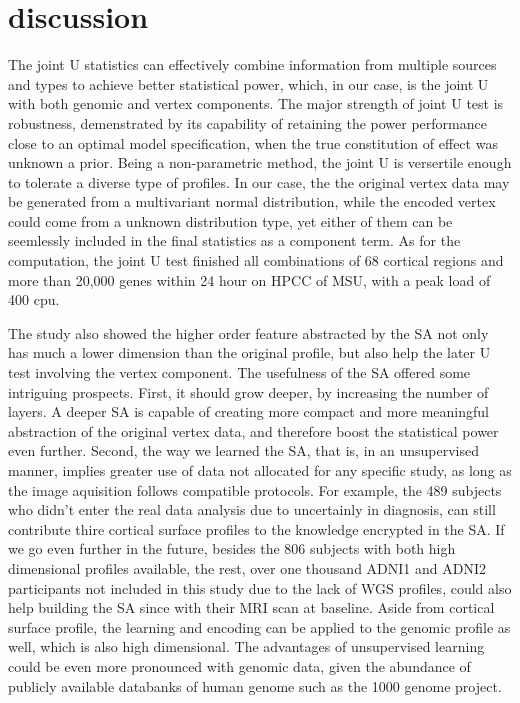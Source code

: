\section{discussion}
The joint U statistics can effectively combine information from multiple sources and types to achieve better statistical power, which, in our case, is the joint U with both genomic and vertex components. The major strength of joint U test is robustness, demenstrated by its capability of retaining the power performance close to an optimal model specification, when the true constitution of effect was unknown a prior. Being a non-parametric method, the joint U is versertile enough to tolerate a diverse type of profiles. In our case, the the original vertex data may be generated from a multivariant normal distribution, while the encoded vertex could come from a unknown distribution type, yet either of them can be seemlessly included in the final statistics as a component term. As for the computation, the joint U test finished all combinations of 68 cortical regions and more than 20,000 genes within 24 hour on HPCC of MSU, with a peak load of 400 cpu. 

The study also showed the higher order feature abstracted by the SA not only has much a lower dimension than the original profile, but also help the later U test involving the vertex component. The usefulness of the SA offered some intriguing prospects. First, it should grow deeper, by increasing the number of layers. A deeper SA is capable of creating more compact and more meaningful abstraction of the original vertex data, and therefore boost the statistical power even further. Second, the way we learned the SA, that is, in an unsupervised manner, implies greater use of data not allocated for any specific study, as long as the image aquisition follows compatible protocols. For example, the 489 subjects who didn't enter the real data analysis due to uncertainly in diagnosis, can still contribute thire cortical surface profiles to the knowledge encrypted in the SA. If we go even further in the future, besides the 806 subjects with both high dimensional profiles available, the rest, over one thousand ADNI1 and ADNI2 participants not included in this study due to the lack of WGS profiles, could also help building the SA since with their MRI scan at baseline. Aside from cortical surface profile, the learning and encoding can be applied to the genomic profile as well, which is also high dimensional. The advantages of unsupervised learning could be even more pronounced with genomic data, given the abundance of publicly available databanks of human genome such as the 1000 genome project.


